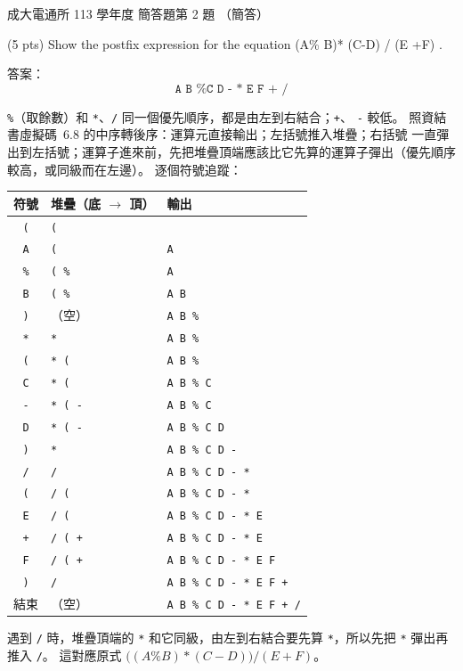 \begin{pastexam}[label={px:ncku-113-cce-11}]{成大電通所 113 學年度 簡答題第 2 題}
（簡答）

(5 pts) Show the postfix expression for the equation (A\% B)* (C-D) / (E +F) .
\end{pastexam}

\begin{pastsoln}
答案：
\[
\texttt{A B \% C D - * E F + /}
\]

\texttt{\%}（取餘數）和 \texttt{*}、\texttt{/} 同一個優先順序，都是由左到右結合；\texttt{+}、
\texttt{-} 較低。 照資結書虛擬碼~6.8 的中序轉後序：運算元直接輸出；左括號推入堆疊；右括號
一直彈出到左括號；運算子進來前，先把堆疊頂端應該比它先算的運算子彈出（優先順序較高，或同級而在左邊）。 逐個符號追蹤：
\begin{center}
\small
\begin{tabular}{cll}
\toprule
符號 & 堆疊（底 $\to$ 頂） & 輸出 \\
\midrule
\texttt{(} & \texttt{(} & \\
\texttt{A} & \texttt{(} & \texttt{A} \\
\texttt{\%} & \texttt{( \%} & \texttt{A} \\
\texttt{B} & \texttt{( \%} & \texttt{A B} \\
\texttt{)} & （空） & \texttt{A B \%} \\
\texttt{*} & \texttt{*} & \texttt{A B \%} \\
\texttt{(} & \texttt{* (} & \texttt{A B \%} \\
\texttt{C} & \texttt{* (} & \texttt{A B \% C} \\
\texttt{-} & \texttt{* ( -} & \texttt{A B \% C} \\
\texttt{D} & \texttt{* ( -} & \texttt{A B \% C D} \\
\texttt{)} & \texttt{*} & \texttt{A B \% C D -} \\
\texttt{/} & \texttt{/} & \texttt{A B \% C D - *} \\
\texttt{(} & \texttt{/ (} & \texttt{A B \% C D - *} \\
\texttt{E} & \texttt{/ (} & \texttt{A B \% C D - * E} \\
\texttt{+} & \texttt{/ ( +} & \texttt{A B \% C D - * E} \\
\texttt{F} & \texttt{/ ( +} & \texttt{A B \% C D - * E F} \\
\texttt{)} & \texttt{/} & \texttt{A B \% C D - * E F +} \\
結束 & （空） & \texttt{A B \% C D - * E F + /} \\
\bottomrule
\end{tabular}
\end{center}
遇到 \texttt{/} 時，堆疊頂端的 \texttt{*} 和它同級，由左到右結合要先算 \texttt{*}，所以先把
\texttt{*} 彈出再推入 \texttt{/}。 這對應原式 $\bigl((A \% B) * (C - D)\bigr) / (E + F)$。
\end{pastsoln}
